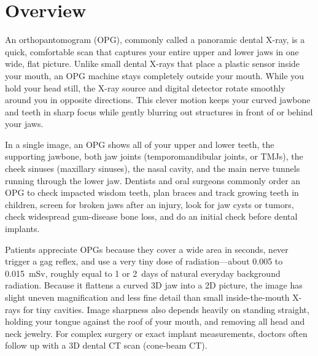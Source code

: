 \label{ch:infographic-opg}

\section{Overview}

An orthopantomogram (OPG), commonly called a panoramic dental X-ray, is a quick, comfortable scan that captures your entire upper and lower jaws in one wide, flat picture. Unlike small dental X-rays that place a plastic sensor inside your mouth, an OPG machine stays completely outside your mouth. While you hold your head still, the X-ray source and digital detector rotate smoothly around you in opposite directions. This clever motion keeps your curved jawbone and teeth in sharp focus while gently blurring out structures in front of or behind your jaws.

In a single image, an OPG shows all of your upper and lower teeth, the supporting jawbone, both jaw joints (temporomandibular joints, or TMJs), the cheek sinuses (maxillary sinuses), the nasal cavity, and the main nerve tunnels running through the lower jaw. Dentists and oral surgeons commonly order an OPG to check impacted wisdom teeth, plan braces and track growing teeth in children, screen for broken jaws after an injury, look for jaw cysts or tumors, check widespread gum-disease bone loss, and do an initial check before dental implants.

Patients appreciate OPGs because they cover a wide area in seconds, never trigger a gag reflex, and use a very tiny dose of radiation---about 0.005 to 0.015~mSv, roughly equal to 1 or 2~days of natural everyday background radiation. Because it flattens a curved 3D jaw into a 2D picture, the image has slight uneven magnification and less fine detail than small inside-the-mouth X-rays for tiny cavities. Image sharpness also depends heavily on standing straight, holding your tongue against the roof of your mouth, and removing all head and neck jewelry. For complex surgery or exact implant measurements, doctors often follow up with a 3D dental CT scan (cone-beam CT).

